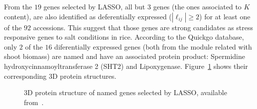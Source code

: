 From the $19$ genes selected by LASSO, all but $3$ genes (the ones associated to $K$ content), are also identified as deferentially expressed ($|\ell_{ij}| \geq 2$) for at least one of the $92$ accessions. This suggest that those genes are strong candidates as stress responsive genes to salt conditions in rice. According to the Quickgo database, only $2$ of the $16$ diferentially expressed genes (both from the module related with shoot biomass) are named and have an associated protein product: Spermidine hydroxycinnamoyltransferase 2 (SHT2) and Lipoxygenase. Figure~\ref{fig:3d} shows their corresponding 3D protein structures.

\begin{figure}[hptb]
  \centering
  \hfill
  \caption{3D protein structure of named genes selected by LASSO, available from~\cite{szklarczyk2016string}.}
  \label{fig:3d}
\end{figure}

